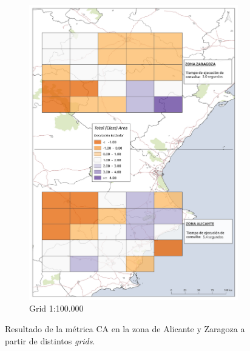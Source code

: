 \begin{figure}
\begin{subfigure}[b]{0.4\textwidth}
    \includegraphics[width=\textwidth]{ResultadosyDiscusion/Figs/Results/c_100.pdf}
    \caption{Grid 1:100.000}
    \label{fig:c_100}
  \end{subfigure}
  
  \caption{Resultado de la métrica CA en la zona de Alicante y Zaragoza a partir de distintos \textit{grids}.}
  \label{fig:c_area}
  \end{figure}







